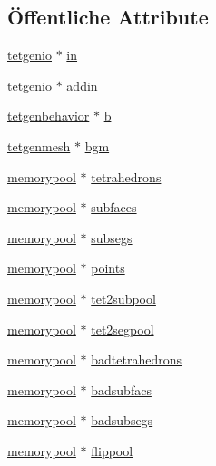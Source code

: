 \subsection*{Öffentliche Attribute}
\begin{DoxyCompactItemize}
\item 
\hyperlink{classtetgenio}{tetgenio} $\ast$ \hyperlink{classtetgenmesh_ad1c82326f58ac7fa521a5fb8bb7ed337}{in}
\item 
\hyperlink{classtetgenio}{tetgenio} $\ast$ \hyperlink{classtetgenmesh_aa9397e3a7fcb518a2652c8621a7aba65}{addin}
\item 
\hyperlink{classtetgenbehavior}{tetgenbehavior} $\ast$ \hyperlink{classtetgenmesh_ae28df2638f22659903e727e2ffa05357}{b}
\item 
\hyperlink{classtetgenmesh}{tetgenmesh} $\ast$ \hyperlink{classtetgenmesh_a7e3caf366c729754f62b410a8fd16c6d}{bgm}
\item 
\hyperlink{classtetgenmesh_1_1memorypool}{memorypool} $\ast$ \hyperlink{classtetgenmesh_ae2ecb721778b73b3b10163e3069247a6}{tetrahedrons}
\item 
\hyperlink{classtetgenmesh_1_1memorypool}{memorypool} $\ast$ \hyperlink{classtetgenmesh_af637b87538d6c06fdbb47b24f940a18e}{subfaces}
\item 
\hyperlink{classtetgenmesh_1_1memorypool}{memorypool} $\ast$ \hyperlink{classtetgenmesh_a1a6e03af9ec55a3366aea8f7e39c67ed}{subsegs}
\item 
\hyperlink{classtetgenmesh_1_1memorypool}{memorypool} $\ast$ \hyperlink{classtetgenmesh_a419c24648d1c776238575e9f950b1124}{points}
\item 
\hyperlink{classtetgenmesh_1_1memorypool}{memorypool} $\ast$ \hyperlink{classtetgenmesh_a978aa6cc9c136c92ac09a6b56afc4eac}{tet2subpool}
\item 
\hyperlink{classtetgenmesh_1_1memorypool}{memorypool} $\ast$ \hyperlink{classtetgenmesh_a1a898456746189f3c656c22eaa6feb48}{tet2segpool}
\item 
\hyperlink{classtetgenmesh_1_1memorypool}{memorypool} $\ast$ \hyperlink{classtetgenmesh_a04983fc27254c1b6a1456862293f74bb}{badtetrahedrons}
\item 
\hyperlink{classtetgenmesh_1_1memorypool}{memorypool} $\ast$ \hyperlink{classtetgenmesh_a5e4083990698cca66aee54fc110dd288}{badsubfacs}
\item 
\hyperlink{classtetgenmesh_1_1memorypool}{memorypool} $\ast$ \hyperlink{classtetgenmesh_ac43e4dd0213f6b589fade06bf09a8d8c}{badsubsegs}
\item 
\hyperlink{classtetgenmesh_1_1memorypool}{memorypool} $\ast$ \hyperlink{classtetgenmesh_a96eb63bf97a4e4b9f9ad7148444bd530}{flippool}

\end{DoxyCompactItemize}
